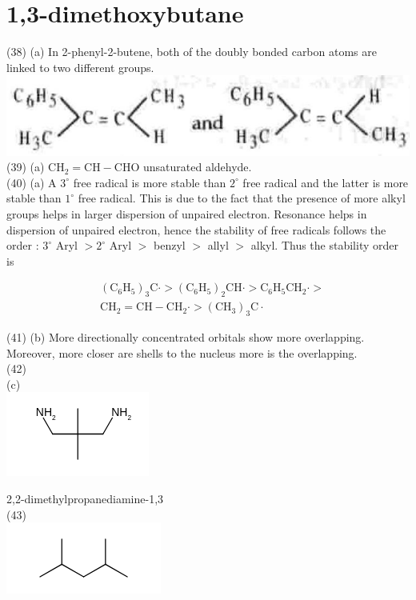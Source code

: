 \documentclass[10pt]{article}
\begin{document}
\section*{1,3-dimethoxybutane}
(38) (a) In 2-phenyl-2-butene, both of the doubly bonded carbon atoms are linked to two different groups.\\
\includegraphics[max width=\textwidth, center]{2025_01_28_8470952b98110cec3aabg-158}\\
(39) (a) $\mathrm{CH}_{2}=\mathrm{CH}-\mathrm{CHO}$ unsaturated aldehyde.\\
(40) (a) A $3^{\circ}$ free radical is more stable than $2^{\circ}$ free radical and the latter is more stable than $1^{\circ}$ free radical. This is due to the fact that the presence of more alkyl groups helps in larger dispersion of unpaired electron. Resonance helps in dispersion of unpaired electron, hence the stability of free radicals follows the order : $3^{\circ}$ Aryl $>2^{\circ}$ Aryl $>$ benzyl $>$ allyl $>$ alkyl. Thus the stability order is

$$
\begin{aligned}
& \left(\mathrm{C}_{6} \mathrm{H}_{5}\right)_{3} \mathrm{C} \cdot>\left(\mathrm{C}_{6} \mathrm{H}_{5}\right)_{2} \mathrm{CH} \cdot>\mathrm{C}_{6} \mathrm{H}_{5} \mathrm{CH}_{2} \cdot> \\
& \mathrm{CH}_{2}=\mathrm{CH}-\mathrm{CH}_{2} \cdot>\left(\mathrm{CH}_{3}\right)_{3} \mathrm{C} \cdot
\end{aligned}
$$

(41) (b) More directionally concentrated orbitals show more overlapping. Moreover, more closer are shells to the nucleus more is the overlapping.\\
(42)\\
(c)\\
\includegraphics{smile-f351c1b663142d469884c996ed6d78e9ad54f4a6}

2,2-dimethylpropanediamine-1,3\\
(43)\\
\includegraphics{smile-e6ea3d4f2d284e8d274a68888833c8b277d042d9}
\end{document}
